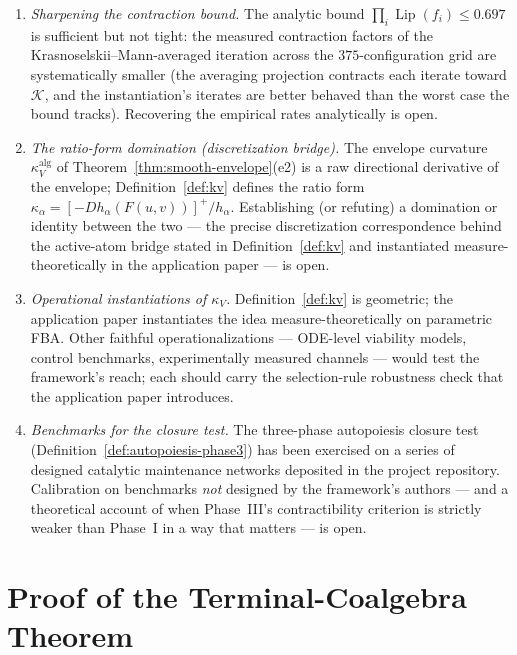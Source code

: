 \documentclass[11pt,a4paper]{article}
\theoremstyle{plain}
\theoremstyle{definition}
\theoremstyle{remark}
\newcommand{\kk}{\kappa_{\!V}}
\DeclareMathOperator{\Lip}{Lip}
\begin{document}
\begin{enumerate}[leftmargin=*,itemsep=3pt]
coherence data, or a proof that no such construction exists under
the stated hypotheses, would close the most significant gap in
Section~\ref{sec:hott} (Remark~\ref{rem:proof-status-hott}).
\item \emph{Sharpening the contraction bound.} The analytic bound
$\prod_i \Lip(f_i) \leq 0.697$ is sufficient but not tight: the
measured contraction factors of the Krasnoselskii--Mann-averaged
iteration across the $375$-configuration grid are systematically
smaller (the averaging projection contracts each iterate toward
$\mathcal K$, and the instantiation's iterates are better behaved
than the worst case the bound tracks). Recovering the
empirical rates analytically is open.
\item \emph{The ratio-form domination (discretization bridge).}
The envelope curvature $\kk^{\mathrm{alg}}$ of
Theorem~\ref{thm:smooth-envelope}(e2) is a raw directional
derivative of the envelope; Definition~\ref{def:kv} defines the
ratio form $\kappa_\alpha = [-D h_\alpha(F(u,v))]^{+}/h_\alpha$.
Establishing (or refuting) a domination or identity between the
two --- the precise discretization correspondence behind the
active-atom bridge stated in Definition~\ref{def:kv} and
instantiated measure-theoretically in the
application paper \citep{zai2026measure} --- is open.
\item \emph{Operational instantiations of $\kk$.}
Definition~\ref{def:kv} is geometric; the application paper
\citep{zai2026measure} instantiates the idea measure-theoretically
on parametric FBA. Other faithful operationalizations --- ODE-level
viability models, control benchmarks, experimentally measured
channels --- would test the framework's reach; each should carry the selection-rule robustness check that the application paper introduces.
\item \emph{Benchmarks for the closure test.} The three-phase
autopoiesis closure test (Definition~\ref{def:autopoiesis-phase3})
has been exercised on a series of designed catalytic maintenance
networks deposited in the project repository. Calibration on
benchmarks \emph{not} designed by the framework's authors --- and a
theoretical account of when Phase~III's contractibility criterion is
strictly weaker than Phase~I in a way that matters --- is open.
\end{enumerate}


\appendix
\section{Proof of the Terminal-Coalgebra Theorem}
\label{app:terminal-coalgebra}
\end{document}
